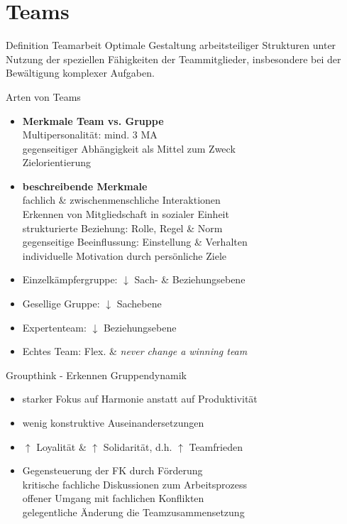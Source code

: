 \documentclass{cheatsheet}
\begin{document}
    \section{Teams}
    \begin{warningbox}{Definition Teamarbeit}
        Optimale Gestaltung arbeitsteiliger Strukturen unter Nutzung der speziellen Fähigkeiten der Teammitglieder, insbesondere bei der Bewältigung komplexer Aufgaben.
    \end{warningbox}
    \begin{sectionbox}{Arten von Teams}
        \begin{itemize}
            \item \textbf{Merkmale Team vs. Gruppe}\\
            \ra Multipersonalität: mind. 3 MA\\
            \ra gegenseitiger Abhängigkeit als Mittel zum Zweck\\
            \ra Zielorientierung
            \item \textbf{beschreibende Merkmale}\\
            \ra fachlich \& zwischenmenschliche Interaktionen\\
            \ra Erkennen von Mitgliedschaft in sozialer Einheit\\
            \ra strukturierte Beziehung: Rolle, Regel \& Norm\\
            \ra gegenseitige Beeinflussung: Einstellung \& Verhalten\\
            \ra individuelle Motivation durch persönliche Ziele
            \item Einzelkämpfergruppe: $\downarrow$ Sach- \&  Beziehungsebene
            \item Gesellige Gruppe: $\downarrow$ Sachebene
            \item Expertenteam: $\downarrow$ Beziehungsebene
            \item Echtes Team: Flex. \& \emph{never change a winning team}
        \end{itemize}
    \end{sectionbox}
    \begin{hintbox}{Groupthink - Erkennen Gruppendynamik}
        \begin{itemize}
            \item starker Fokus auf Harmonie anstatt auf Produktivität
            \item wenig konstruktive Auseinandersetzungen\\
            \item $\uparrow$ Loyalität \& $\uparrow$ Solidarität, d.h. $\uparrow$ Teamfrieden
            \item Gegensteuerung der FK durch Förderung\\
            \ra kritische fachliche Diskussionen zum Arbeitsprozess\\
            \ra offener Umgang mit fachlichen Konflikten\\
            \ra gelegentliche Änderung  die Teamzusammensetzung
        \end{itemize}
    \end{hintbox}
\end{document}
